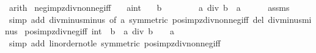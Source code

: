 \begin{isabellebody}
\ arith%
\endisatagproof
{\isafoldproof}%
%
\isadelimproof
\isanewline
%
\endisadelimproof
\isanewline
\isanewline
{}\isamarkupfalse%
\ neg{\isacharunderscore}{\kern0pt}imp{\isacharunderscore}{\kern0pt}zdiv{\isacharunderscore}{\kern0pt}nonneg{\isacharunderscore}{\kern0pt}iff{\isacharcolon}{\kern0pt}\isanewline
\ \ \ a{\isacharcolon}{\kern0pt}{\isacharcolon}{\kern0pt}int\isanewline
\ \ \ {\isachardoublequoteopen}b\ {\isacharless}{\kern0pt}\ {}{\isachardoublequoteclose}\ \isanewline
\ \ \ {\isachardoublequoteopen}{\isacharparenleft}{\kern0pt}{}\ {\isasymle}\ a\ div\ b{\isacharparenright}{\kern0pt}\ {\isacharequal}{\kern0pt}\ {\isacharparenleft}{\kern0pt}a\ {\isasymle}\ {}{\isacharparenright}{\kern0pt}{\isachardoublequoteclose}\isanewline
%
\isadelimproof
\ \ %
\endisadelimproof
%
\isatagproof
{}\isamarkupfalse%
\ assms\ \isamarkupfalse%
\ {\isacharparenleft}{\kern0pt}simp\ add{\isacharcolon}{\kern0pt}\ div{\isacharunderscore}{\kern0pt}minus{\isacharunderscore}{\kern0pt}minus\ {\isacharbrackleft}{\kern0pt}of\ a{\isacharcomma}{\kern0pt}\ symmetric{\isacharbrackright}{\kern0pt}\ pos{\isacharunderscore}{\kern0pt}imp{\isacharunderscore}{\kern0pt}zdiv{\isacharunderscore}{\kern0pt}nonneg{\isacharunderscore}{\kern0pt}iff\ del{\isacharcolon}{\kern0pt}\ div{\isacharunderscore}{\kern0pt}minus{\isacharunderscore}{\kern0pt}minus{\isacharparenright}{\kern0pt}%
\endisatagproof
{\isafoldproof}%
%
\isadelimproof
\isanewline
%
\endisadelimproof
\isanewline
\isanewline
{}\isamarkupfalse%
\ pos{\isacharunderscore}{\kern0pt}imp{\isacharunderscore}{\kern0pt}zdiv{\isacharunderscore}{\kern0pt}neg{\isacharunderscore}{\kern0pt}iff{\isacharcolon}{\kern0pt}\ {\isachardoublequoteopen}{\isacharparenleft}{\kern0pt}{}{\isacharcolon}{\kern0pt}{\isacharcolon}{\kern0pt}int{\isacharparenright}{\kern0pt}\ {\isacharless}{\kern0pt}\ b\ {\isacharequal}{\kern0pt}{\isacharequal}{\kern0pt}{\isachargreater}{\kern0pt}\ {\isacharparenleft}{\kern0pt}a\ div\ b\ {\isacharless}{\kern0pt}\ {}{\isacharparenright}{\kern0pt}\ {\isacharequal}{\kern0pt}\ {\isacharparenleft}{\kern0pt}a\ {\isacharless}{\kern0pt}\ {}{\isacharparenright}{\kern0pt}{\isachardoublequoteclose}\isanewline
%
\isadelimproof
\ \ %
\endisadelimproof
%
\isatagproof
{}\isamarkupfalse%
\ {\isacharparenleft}{\kern0pt}simp\ add{\isacharcolon}{\kern0pt}\ linorder{\isacharunderscore}{\kern0pt}not{\isacharunderscore}{\kern0pt}le\ {\isacharbrackleft}{\kern0pt}symmetric{\isacharbrackright}{\kern0pt}\ pos{\isacharunderscore}{\kern0pt}imp{\isacharunderscore}{\kern0pt}zdiv{\isacharunderscore}{\kern0pt}nonneg{\isacharunderscore}{\kern0pt}iff{\isacharparenright}{\kern0pt}%

\end{isabellebody}
